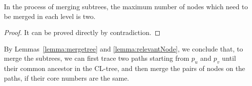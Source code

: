 %
%
%

\begin{lemma}
\label{lemma:relevantNode}
In the process of merging subtrees, the maximum number of nodes which need to be merged in each level is two.
\end{lemma}
\begin{proof}
It can be proved directly by contradiction.
\end{proof}

By Lemmas~\ref{lemma:mergetree} and \ref{lemma:relevantNode}, we conclude that,
to merge the subtrees, we can first trace two paths starting from $p_u$ and $p_v$ until their common ancestor in the CL-tree,
and then merge the pairs of nodes on the paths, if their core numbers are the same.

